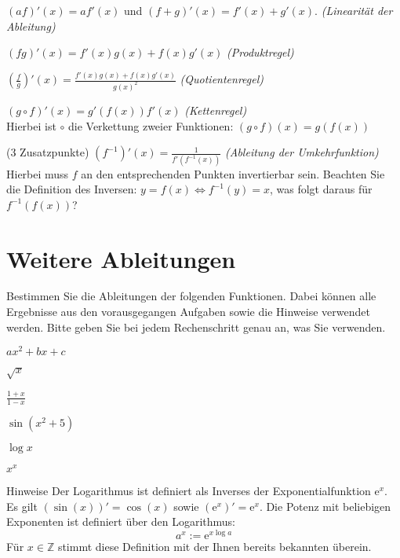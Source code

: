 \documentclass{scrartcl}
\begin{document}
\begin{subex}
  \item $(a f)'(x) = a f'(x)$ und $(f + g)'(x) = f'(x) + g'(x).$ \emph{(Linearität der Ableitung)}
  \item $(f g)'(x) = f'(x) g(x) + f(x) g'(x)$ \emph{(Produktregel)}
  \item $\left( \frac{f}{g} \right)'(x) = \frac{f'(x) g(x) + f(x) g'(x)}{g(x)^2}$ \emph{(Quotientenregel)}
  \item $(g \circ f)'(x) = g'(f(x)) f'(x)$ \emph{(Kettenregel)}\\
  Hierbei ist $\circ$ die Verkettung zweier Funktionen: $(g \circ f)(x) = g(f(x))$
  \item(3 Zusatzpunkte) $(f^{-1})'(x) = \frac{1}{f'\left( f^{-1}(x) \right)}$ \emph{(Ableitung der Umkehrfunktion)}\\
  Hierbei muss $f$ an den entsprechenden Punkten invertierbar sein.
  Beachten Sie die Definition des Inversen: $y = f(x) \iff f^{-1}(y) = x$, was folgt daraus für $f^{-1}(f(x))$?
\end{subex}


\section{Weitere Ableitungen}
\label{sec:weitere_ableitungen}

Bestimmen Sie die Ableitungen der folgenden Funktionen.
Dabei können alle Ergebnisse aus den vorausgegangen Aufgaben sowie die Hinweise verwendet werden.
Bitte geben Sie bei jedem Rechenschritt genau an, was Sie verwenden.

\begin{subex*}
  \item $a x^2 + b x + c$
  \item $\sqrt{x}$
  \item $\frac{1 + x}{1 - x}$
  \item $\sin (x^2 + 5)$
  \item $\log x$
  \item $x^x$
\end{subex*}

\begin{remark}{Hinweise}
  Der Logarithmus ist definiert als Inverses der Exponentialfunktion $\mathrm{e}^x$.
  Es gilt $(\sin(x))' = \cos(x)$ sowie $\left( \mathrm{e}^x \right)' = \mathrm{e}^x$.
  Die Potenz mit beliebigen Exponenten ist definiert über den Logarithmus:
  \[
    a^x := \mathrm{e}^{x \log a}
  \]
  Für $x \in \mathbb{Z}$ stimmt diese Definition mit der Ihnen bereits bekannten überein. 
\end{remark}
\end{document}
